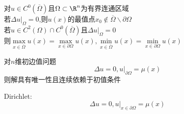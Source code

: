 \begin{dingli*}
对$u\in C^0(\overline{\Omega})$且$\Omega\subset\R^n$为有界连通区域\\
若$\Delta u|_{\Omega}=0$,则$u(x)$的最值点$x_0\notin\overline{\Omega}\backslash\partial\Omega$\\
若$u\in C^2(\Omega)\cap C^0(\overline{\Omega})$且$\Delta u|_{\Omega}=0$\\
则$\max\limits_{x\in\overline{\Omega}}u(x)=\max\limits_{x\in\partial\Omega}u(x),\min\limits_{x\in\overline{\Omega}}u(x)=\min\limits_{x\in\partial\Omega}u(x)$
\end{dingli*}

\begin{dingli*}
对$n$维初边值问题
\[\Delta u=0,u|_{\partial \Omega}=\mu(x)\]
则解具有唯一性且连续依赖于初值条件
\end{dingli*}

Dirichlet:
\[\Delta u=0,u|_{x\in\partial\Omega}=\mu(x)\]

